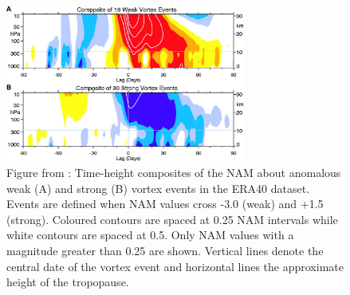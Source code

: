\begin{figure}[h!]
\centering
    \includegraphics[width=0.7\textwidth]{Figures/Figures-background/baldwin_composite.jpg}
    \caption[Time-height composites of the NAM about anomalous vortex events in the ERA40 dataset from \cite{baldwinStratospheric2001a}.]{Figure from \cite{baldwinStratospheric2001a}: Time-height composites of the NAM about anomalous weak (A) and strong (B) vortex events in the ERA40 dataset. Events are defined when NAM values cross -3.0 (weak) and +1.5 (strong). Coloured contours are spaced at 0.25 NAM intervals while white contours are spaced at 0.5. Only NAM values with a magnitude greater than 0.25 are shown. Vertical lines denote the central date of the vortex event and horizontal lines the approximate height of the tropopause.}  
    \label{fig:Baldwin_composite}
\centering
\end{figure}

